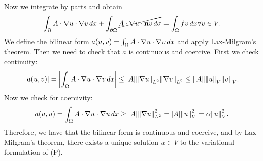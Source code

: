 Now we integrate by parts and obtain
\[
    \int_{\Omega} A \cdot \nabla u \cdot \nabla v \, dx + \cancel{\int_{\partial \Omega} A \cdot \nabla u \cdot \textbf{n} v \, d\sigma}= \int_{\Omega} f v \, dx \forall v \in V.
\]
We define the bilinear form \(a(u,v) = \int_{\Omega} A \cdot \nabla u \cdot
\nabla v \, dx\) and apply Lax-Milgram's theorem. Then we need to check that
\(a\) is continuous and coercive. First we check continuity:
\[
    \abs{a(u,v)} = \abs{\int_{\Omega} A \cdot \nabla u \cdot \nabla v \, dx} \leq \abs{A} \norm{\nabla u}_{L^2} \norm{\nabla v}_{L^2} \leq \norm{A} \norm{u}_{V} \norm{v}_{V}.
\]
Now we check for coercivity:
\[
    a(u,u) = \int_{\Omega} A \cdot \nabla u \cdot \nabla u \, dx \geq \abs{A} \norm{\nabla u}_{L^2}^2 = \abs{A}  \norm{u}_{V}^2 = \alpha \norm{u}_{V}^2.
\]
Therefore, we have that the bilinear form is continuous and coercive, and by
Lax-Milgram's theorem, there exists a unique solution \(u \in V\) to the
variational formulation of (P).

